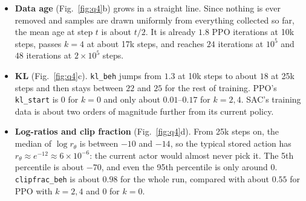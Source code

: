 \documentclass[11pt]{article}
\newcommand{\code}[1]{\texttt{#1}}
\begin{document}
\begin{table}[h]
\centering
{}
\caption{Q4 summary (mean $\pm$ std over seeds). KL and clip fraction for SAC are \code{kl\_beh} and
\code{clipfrac\_beh} after the first 25k steps; for PPO they are \code{kl\_start} and \code{clipfrac\_start}
averaged over 100k--200k steps. The PPO $k=2,4$ runs reached 1000 after $2\times10^5$ steps for some seeds
(they ran to $3\times10^5$ in Assignment 3).}
\label{tab:q4}
\end{table}

\begin{itemize}
  \item \textbf{Data age} (Fig.~\ref{fig:q4}b) grows in a straight line. Since nothing is ever removed and
        samples are drawn uniformly from everything collected so far, the mean age at step $t$ is about $t/2$.
        It is already $1.8$ PPO iterations at 10k steps, passes $k=4$ at about 17k steps, and reaches
        $24$ iterations at $10^5$ and $48$ iterations at $2\times10^5$ steps.
  \item \textbf{KL} (Fig.~\ref{fig:q4}c). \code{kl\_beh} jumps from $1.3$ at 10k steps to about $18$ at 25k
        steps and then stays between $22$ and $25$ for the rest of training. PPO's \code{kl\_start} is $0$ for
        $k=0$ and only about $0.01$--$0.17$ for $k=2,4$. SAC's training data is about two orders of
        magnitude further from its current policy.
  \item \textbf{Log-ratios and clip fraction} (Fig.~\ref{fig:q4}d). From 25k steps on, the median of
        $\log r_\theta$ is between $-10$ and $-14$, so the typical stored action has
        $r_\theta\approx e^{-12}\approx 6\times10^{-6}$: the current actor would almost never pick it.
        The 5th percentile is about $-70$, and even the 95th percentile is only around $0$.
        \code{clipfrac\_beh} is about $0.98$ for the whole run, compared with about $0.55$ for PPO with
        $k=2,4$ and $0$ for $k=0$.
\end{itemize}
\end{document}
